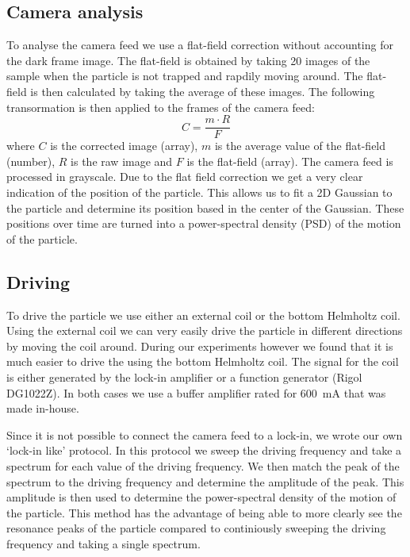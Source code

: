 \subsection{Camera analysis}
To analyse the camera feed we use a flat-field correction without accounting for the dark frame image. The flat-field is obtained by taking 20 images of the sample when the particle is not trapped and rapdily moving around. The flat-field is then calculated by taking the average of these images. The following transormation is then applied to the frames of the camera feed:
\begin{equation}
    C = \frac{m \cdot R}{F}
    \tag{flat-field correction}
    \label{eq:flat-field-correction}
\end{equation}
where $C$ is the corrected image (array), $m$ is the average value of the flat-field (number), $R$ is the raw image and $F$ is the flat-field (array). The camera feed is processed in grayscale. Due to the flat field correction we get a very clear indication of the position of the particle. This allows us to fit a 2D Gaussian to the particle and determine its position based in the center of the Gaussian. These positions over time are turned into a power-spectral density (PSD) of the motion of the particle.

\subsection{Driving}
To drive the particle we use either an external coil or the bottom Helmholtz coil. Using the external coil we can very easily drive the particle in different directions by moving the coil around. During our experiments however we found that it is much easier to drive the \zmode using the bottom Helmholtz coil. The signal for the coil is either generated by the lock-in amplifier or a function generator (Rigol DG1022Z). In both cases we use a buffer amplifier rated for \qty{600}{\milli\ampere} that was made in-house.

Since it is not possible to connect the camera feed to a lock-in, we wrote our own `lock-in like' protocol. In this protocol we sweep the driving frequency and take a spectrum for each value of the driving frequency. We then match the peak of the spectrum to the driving frequency and determine the amplitude of the peak. This amplitude is then used to determine the power-spectral density of the motion of the particle. This method has the advantage of being able to more clearly see the resonance peaks of the particle compared to continiously sweeping the driving frequency and taking a single spectrum.
